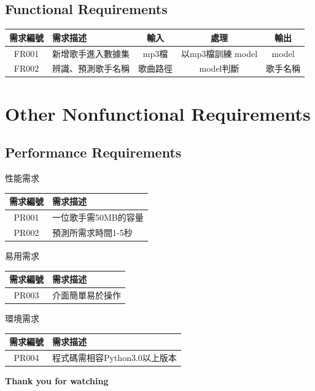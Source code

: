 \documentclass{article}
\begin{document}
\begin{CJK}{UTF8}{bkai}
\subsection{ \Large Functional Requirements}
 \begin{center}
	\begin{tabular}{|c|p{3cm}|c|c|c|}\hline
		需求編號 &  需求描述&輸入&處理&輸出 \\ \hline
		FR001 &  新增歌手進入數據集&mp3檔&以mp3檔訓練 model&model \\ \hline
		FR002 &  辨識、預測歌手名稱&歌曲路徑&model判斷&歌手名稱\\\hline
	\end{tabular}
\end{center}

\section{\huge\bf  \color {blue}  Other Nonfunctional Requirements }
\subsection{ \Large Performance Requirements}
\begin{center}
	性能需求\\
	\begin{tabular}{|c|p{8cm}|}\hline
		需求編號 & 需求描述 \\ \hline
		PR001 &  一位歌手需50MB的容量  \\ \hline
		PR002 & 預測所需求時間1-5秒  \\ \hline
	\end{tabular}
\end{center}
\begin{center}
	易用需求\\
	\begin{tabular}{|c|p{8cm}|}\hline
		需求編號  & 需求描述 \\ \hline
		PR003  &介面簡單易於操作  \\ \hline
	\end{tabular}
\end{center}
\begin{center}
	環境需求\\
	\begin{tabular}{|c|p{8cm}|}\hline
		需求編號 & 需求描述 \\ \hline
		PR004 & 程式碼需相容Python3.0以上版本  \\ \hline
	\end{tabular}
\end{center}


\newpage
\Huge\bf   Thank you for watching


\end{CJK}
\end{document}
